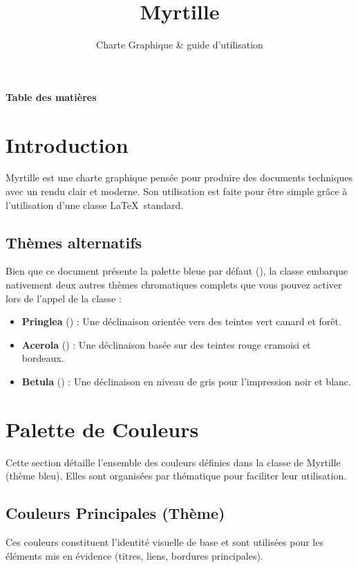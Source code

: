 \documentclass[theme=myrtille]{myrtille}
\title{Myrtille}
\subtitle{Charte Graphique \& guide d'utilisation}
\begin{document}
\makecover

{\sffamily\Large\bfseries\color{dark} Table des matières}\par
\vspace{-15pt} %
\hrulefull
\tableofcontents

\newpage


\section{Introduction}
Myrtille est une charte graphique pensée pour produire des documents techniques avec un rendu clair et moderne. Son utilisation est faite pour être simple grâce à l'utilisation d'une classe \LaTeX\ standard. 

\subsection{Thèmes alternatifs}
Bien que ce document présente la palette bleue par défaut (), la classe embarque nativement deux autres thèmes chromatiques complets que vous pouvez activer lors de l'appel de la classe :
\begin{itemize}
    \item \textbf{Pringlea} () : Une déclinaison orientée vers des teintes vert canard et forêt.
    \item \textbf{Acerola} () : Une déclinaison basée sur des teintes rouge cramoisi et bordeaux.
    \item \textbf{Betula} () : Une déclinaison en niveau de gris pour l'impression noir et blanc.
\end{itemize}

\section{Palette de Couleurs}
Cette section détaille l'ensemble des couleurs définies dans la classe de Myrtille (thème bleu). Elles sont organisées par thématique pour faciliter leur utilisation.

\subsection{Couleurs Principales (Thème)}
Ces couleurs constituent l'identité visuelle de base et sont utilisées pour les éléments mis en évidence (titres, liens, bordures principales).
\end{document}
